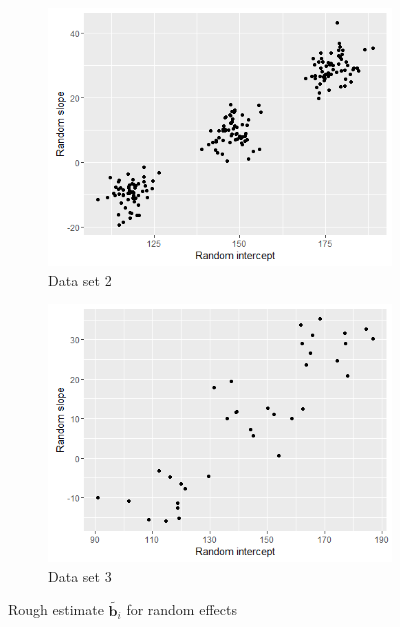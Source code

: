 \begin{figure}[!htb]
\centering
\captionsetup{justification=centering}
\begin{subfigure}[b]{0.4\textwidth}
		\includegraphics[width=\textwidth]{mainmatter/chapter_5_simulation_study/ds_3wellsep_randplot.png}
        \caption{\label{fig : ds_3wellsep_randplot}Data set 2}
	\end{subfigure}
	\begin{subfigure}[b]{0.4\textwidth}
		\includegraphics[width=\textwidth]{mainmatter/chapter_5_simulation_study/ds_3wellsep3ppg_randplot.png}
       \caption{\label{fig : ds_3wellsep3ppg_randplot}Data set 3}
	\end{subfigure}    
    
\caption{\label{fig : ds_3comp_3ppgwelsep}Rough estimate $\tilde{\boldsymbol{b}_i}$ for random effects}
\end{figure}

